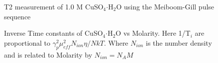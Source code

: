 \documentclass[
reprint,
amsmath,amssymb,
aps,
tikz,
border=5pt
]{revtex4-1}
\begin{document}
  \begin{figure}[h]
    \resizebox{0.45\textwidth}{!}{}
    \caption{T2 measurement of 1.0 M CuSO$_{4} \boldsymbol{\cdot} $H$_2$O using the Meiboom-Gill pulse sequence }
    \label{fig:1d0_t2}
  \end{figure}



  \begin{figure}[h]
    \resizebox{0.45\textwidth}{!}{}
    \caption{Inverse Time constants of CuSO$_{4} \boldsymbol{\cdot} $H$_2$O vs Molarity. Here 1/T$_i$ are proportional to $\gamma^2_p \mu^2_{eff} N_{ion} \eta / NkT$. Where $N_{ion}$ is the number density and is related to Molarity by $N_{ion} = N_A M$ }
    \label{fig:cu_linear}
  \end{figure}


{}
\end{document}

